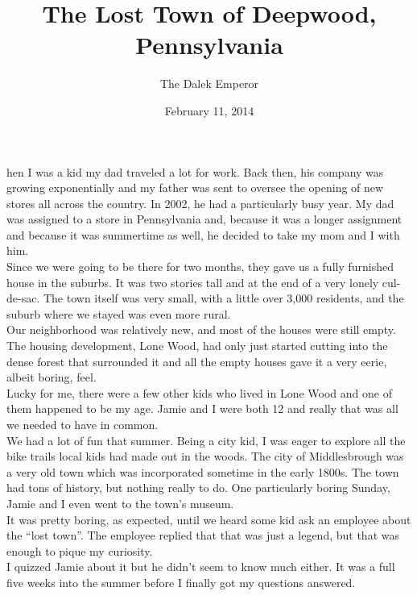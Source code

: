 \documentclass[a5paper]{scrartcl}
\title{The Lost Town of Deepwood, Pennsylvania}
\author{The Dalek Emperor}
\date{February 11, 2014}
\begin{document}
\maketitle

hen I was a kid my dad traveled a lot for work. Back then, his company was growing exponentially and my father was sent to oversee the opening of new stores all across the country. In 2002, he had a particularly busy year. My dad was assigned to a store in Pennsylvania and, because it was a longer assignment and because it was summertime as well, he decided to take my mom and I with him. \\


Since we were going to be there for two months, they gave us a fully furnished house in the suburbs. It was two stories tall and at the end of a very lonely cul-de-sac. The town itself was very small, with a little over 3,000 residents, and the suburb where we stayed was even more rural.  \\


Our neighborhood was relatively new, and most of the houses were still empty. The housing development, Lone Wood, had only just started cutting into the dense forest that surrounded it and all the empty houses gave it a very eerie, albeit boring, feel. \\


Lucky for me, there were a few other kids who lived in Lone Wood and one of them happened to be my age. Jamie and I were both 12 and really that was all we needed to have in common. \\


We had a lot of fun that summer. Being a city kid, I was eager to explore all the bike trails local kids had made out in the woods. The city of Middlesbrough was a very old town which was incorporated sometime in the early 1800s. The town had tons of history, but nothing really to do. One particularly boring Sunday, Jamie and I even went to the town's museum. \\


It was pretty boring, as expected, until we heard some kid ask an employee about the \enquote{lost town}. The employee replied that that was just a legend, but that was enough to pique my curiosity.\\


I quizzed Jamie about it but he didn't seem to know much either. It was a full five weeks into the summer before I finally got my questions answered.\\
\end{document}

